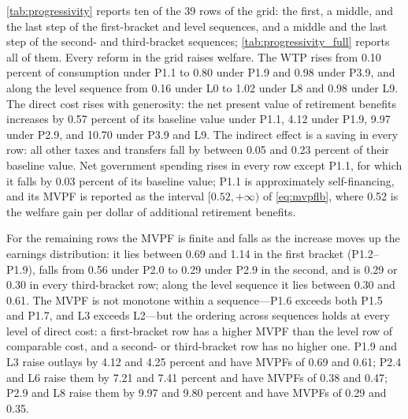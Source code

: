 \autoref{tab:progressivity} reports ten of the 39 rows of the grid: the first, a middle, and the last step of the first-bracket and level sequences, and a middle and the last step of the second- and third-bracket sequences; \autoref{tab:progressivity_full} reports all of them. Every reform in the grid raises welfare. The WTP rises from 0.10 percent of consumption under P1.1 to 0.80 under P1.9 and 0.98 under P3.9, and along the level sequence from 0.16 under L0 to 1.02 under L8 and 0.98 under L9. %
The direct cost rises with generosity: the net present value of retirement benefits increases by 0.57 percent of its baseline value under P1.1, 4.12 under P1.9, 9.97 under P2.9, and 10.70 under P3.9 and L9. %
The indirect effect is a saving in every row: all other taxes and transfers fall by between 0.05 and 0.23 percent of their baseline value. %
Net government spending rises in every row except P1.1, for which it falls by 0.03 percent of its baseline value; P1.1 is approximately self-financing, and its MVPF is reported as the interval $[0.52,+\infty)$ of \eqref{eq:mvpflb}, where 0.52 is the welfare gain per dollar of additional retirement benefits. %

For the remaining rows the MVPF is finite and falls as the increase moves up the earnings distribution: it lies between 0.69 and 1.14 in the first bracket (P1.2--P1.9), falls from 0.56 under P2.0 to 0.29 under P2.9 in the second, and is 0.29 or 0.30 in every third-bracket row; along the level sequence it lies between 0.30 and 0.61. %
The MVPF is not monotone within a sequence---P1.6 exceeds both P1.5 and P1.7, and L3 exceeds L2---but the ordering across sequences holds at every level of direct cost: a first-bracket row has a higher MVPF than the level row of comparable cost, and a second- or third-bracket row has no higher one. %
P1.9 and L3 raise outlays by 4.12 and 4.25 percent and have MVPFs of 0.69 and 0.61; P2.4 and L6 raise them by 7.21 and 7.41 percent and have MVPFs of 0.38 and 0.47; P2.9 and L8 raise them by 9.97 and 9.80 percent and have MVPFs of 0.29 and 0.35. %

